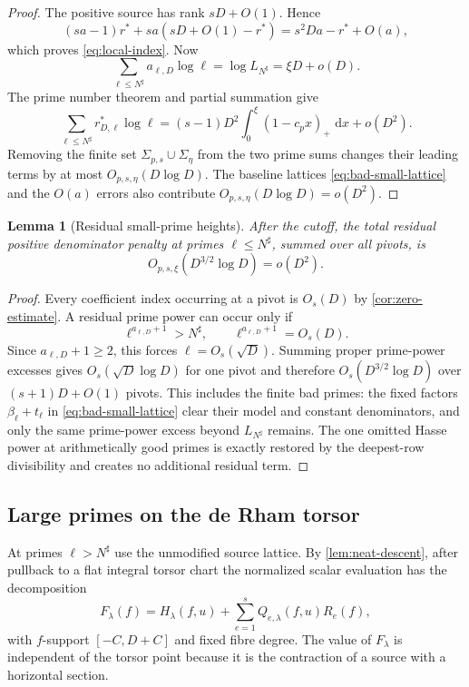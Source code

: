 \documentclass[11pt]{article}
\newtheorem{lemma}[lemma]{Lemma}
\theoremstyle{definition}
\theoremstyle{remark}
\newcommand{\dd}{\,\mathrm d}
\begin{document}
\begin{proof}
The positive source has rank $sD+O(1)$.  Hence
\[
 (sa-1)r^*+sa(sD+O(1)-r^*)
 =s^2Da-r^*+O(a),
\]
which proves \eqref{eq:local-index}.  Now
\[
 \sum_{\ell\le N^\sharp}a_{\ell,D}\log\ell
 =\log L_{N^\sharp}=\xi D+o(D).
\]
The prime number theorem and partial summation give
\[
 \sum_{\ell\le N^\sharp}r^*_{D,\ell}\log\ell
 =(s-1)D^2\int_0^\xi(1-c_px)_+\,\dd x+o(D^2).
\]
Removing the finite set $\Sigma_{p,s}\cup\Sigma_\eta$ from the two prime
sums changes their leading terms by at most $O_{p,s,\eta}(D\log D)$.  The
baseline lattices \eqref{eq:bad-small-lattice} and the $O(a)$ errors also
contribute $O_{p,s,\eta}(D\log D)=o(D^2)$.
\end{proof}

\begin{lemma}[Residual small-prime heights]\label{lem:small-residual}
After the cutoff, the total residual positive denominator penalty at primes
$\ell\le N^\sharp$, summed over all pivots, is
\[
 O_{p,s,\xi}(D^{3/2}\log D)=o(D^2).
\]
\end{lemma}

\begin{proof}
Every coefficient index occurring at a pivot is $O_s(D)$ by
\cref{cor:zero-estimate}.  A residual prime power can occur only if
\[
 \ell^{a_{\ell,D}+1}>N^\sharp,
 \qquad
 \ell^{a_{\ell,D}+1}=O_s(D).
\]
Since $a_{\ell,D}+1\ge2$, this forces $\ell=O_s(\sqrt D)$.  Summing proper
prime-power excesses gives $O_s(\sqrt D\log D)$ for one pivot and therefore
$O_s(D^{3/2}\log D)$ over $(s+1)D+O(1)$ pivots.  This includes the finite bad
primes: the fixed factors $\beta_\ell+t_\ell$ in
\eqref{eq:bad-small-lattice} clear their model and constant denominators, and
only the same prime-power excess beyond $L_{N^\sharp}$ remains.  The one omitted Hasse
power at arithmetically good primes is exactly restored by the deepest-row
divisibility and creates no additional residual term.
\end{proof}

\subsection{Large primes on the de Rham torsor}

At primes $\ell>N^\sharp$ use the unmodified source lattice.  By
\cref{lem:neat-descent}, after pullback to a flat integral torsor chart the
normalized scalar evaluation has the decomposition
\begin{equation}\label{eq:torsor-eval}
 F_\lambda(f)=H_\lambda(f,u)+
 \sum_{e=1}^sQ_{e,\lambda}(f,u)R_e(f),
\end{equation}
with $f$-support $[-C,D+C]$ and fixed fibre degree.  The value of
$F_\lambda$ is independent of the torsor point because it is the contraction
of a source with a horizontal section.
\end{document}
